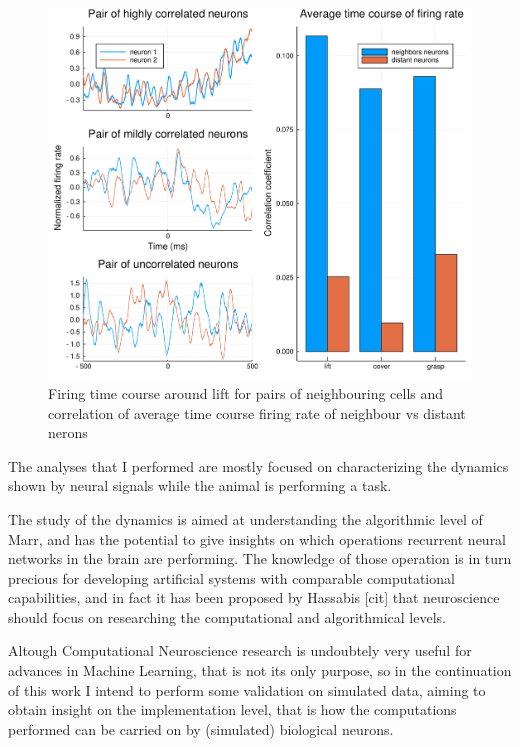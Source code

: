 \begin{figure}[h]
	\centering
	\includegraphics[scale=0.5]{../../plots/corr-coef.pdf}
	\caption{Firing time course around lift for pairs of neighbouring cells and correlation of average time course firing rate of neighbour vs distant nerons}
	\label{fig:corr-coeff}
\end{figure}

The analyses that I performed are mostly focused on characterizing the dynamics shown by neural signals while the animal is performing a task. 

The study of the dynamics is aimed at understanding the algorithmic level of Marr, and has the potential to give insights on which operations recurrent neural networks in the brain are performing. The knowledge of those operation is in turn precious for developing artificial systems with comparable computational capabilities, and in fact it has been proposed by Hassabis [cit] that neuroscience should focus on researching the computational and algorithmical levels. 

Altough Computational Neuroscience research is undoubtely very useful for advances in Machine Learning, that is not its only purpose, so in the continuation of this work I intend to perform some validation on simulated data, aiming to obtain insight on the implementation level, that is how the computations performed can be carried on by (simulated) biological neurons.

